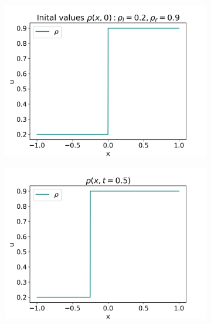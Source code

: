 \documentclass[10pt]{article}
\numberwithin{equation}{section}
\begin{document}
\begin{figure}
     \centering
     \begin{subfigure}[b]{0.3\textwidth}
         \centering
         \includegraphics[width=\textwidth]{Figures/Model/BackwShockIV.png}
     \end{subfigure}
     \hfill
     \begin{subfigure}[b]{0.3\textwidth}
         \centering
         \includegraphics[width=\textwidth]{Figures/Model/BackwShockAtTime.png}
     \end{subfigure}
     \hfill

\end{figure}
\end{document}
